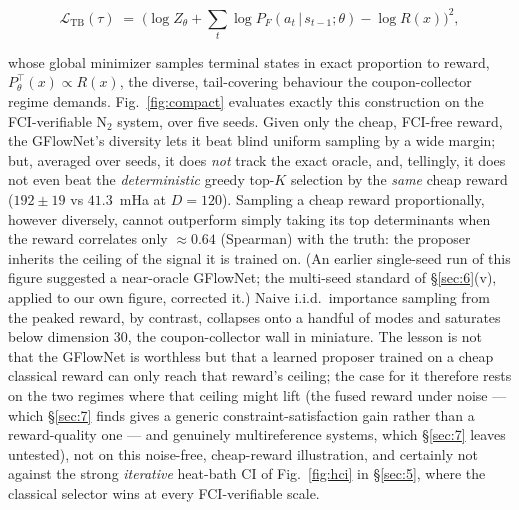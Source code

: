 \documentclass[11pt]{article}
\begin{document}
\begin{equation}
\mathcal L_{\mathrm{TB}}(\tau) \;=\; \Big(\log Z_\theta + \sum_{t}\log P_F(a_t\,|\,s_{t-1};\theta) - \log R(x)\Big)^{2},
\end{equation}

whose global minimizer samples terminal states in exact proportion to reward, $P^{\top}_\theta(x)\propto R(x)$, the diverse, tail-covering behaviour the coupon-collector regime demands. Fig.~\ref{fig:compact} evaluates exactly this construction on the FCI-verifiable N$_2$ system, over five seeds. Given only the cheap, FCI-free reward, the GFlowNet's diversity lets it beat blind uniform sampling by a wide margin; but, averaged over seeds, it does \emph{not} track the exact oracle, and, tellingly, it does not even beat the \emph{deterministic} greedy top-$K$ selection by the \emph{same} cheap reward ($192\pm19$ vs $41.3$~mHa at $D{=}120$). Sampling a cheap reward proportionally, however diversely, cannot outperform simply taking its top determinants when the reward correlates only ${\approx}0.64$ (Spearman) with the truth: the proposer inherits the ceiling of the signal it is trained on. (An earlier single-seed run of this figure suggested a near-oracle GFlowNet; the multi-seed standard of \S\ref{sec:6}(v), applied to our own figure, corrected it.) Naive i.i.d.\ importance sampling from the peaked reward, by contrast, collapses onto a handful of modes and saturates below dimension $30$, the coupon-collector wall in miniature. The lesson is not that the GFlowNet is worthless but that a learned proposer trained on a cheap classical reward can only reach that reward's ceiling; the case for it therefore rests on the two regimes where that ceiling might lift (the fused reward under noise --- which \S\ref{sec:7} finds gives a generic constraint-satisfaction gain rather than a reward-quality one --- and genuinely multireference systems, which \S\ref{sec:7} leaves untested), not on this noise-free, cheap-reward illustration, and certainly not against the strong \emph{iterative} heat-bath CI of Fig.~\ref{fig:hci} in \S\ref{sec:5}, where the classical selector wins at every FCI-verifiable scale.
\end{document}
